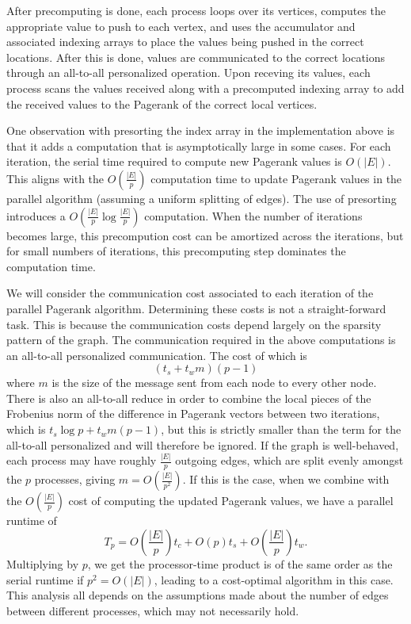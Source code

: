 \documentclass[a4paper]{article}
\begin{document}
After precomputing is done, each process loops over its vertices, computes the appropriate value to push to each vertex, and uses the accumulator and
associated indexing arrays to place the values being pushed in the correct locations. After this is done, values are communicated to the correct
locations through an all-to-all personalized operation. Upon receving its values, each process scans the values received along with a precomputed
indexing array to add the received values to the Pagerank of the correct local vertices.

One observation with presorting the index array in the implementation above is that it adds a computation that is asymptotically large in some cases. For each
iteration, the serial time required to compute new Pagerank values is $O(|E|)$. This aligns with the $O(\frac{|E|}{p})$ computation time to update
Pagerank values in the parallel algorithm (assuming a uniform splitting of edges). The use of presorting introduces a $O(\frac{|E|}{p} \log \frac{|E|}{p} )$ computation. When the number of
iterations becomes large, this precompution cost can be amortized across the iterations, but for small numbers of iterations, this
precomputing step dominates the computation time.

We will consider the communication cost associated to each iteration of the parallel Pagerank algorithm. Determining these costs is not a straight-forward task. This is because the communication
costs depend largely on the sparsity pattern of the graph. The communication required in the above computations is an all-to-all personalized
communication. The cost of which is
\[ (t_s + t_w m) (p - 1) \]
where $m$ is the size of the message sent from each node to every other node. There is also an all-to-all reduce in order to combine the local pieces
of the Frobenius norm of the difference in Pagerank vectors between two iterations, which is $t_s \log p + t_w m (p-1)$, but this is strictly smaller
than the term for the all-to-all personalized and will therefore be ignored. If the graph is well-behaved, each process may have roughly
$\frac{|E|}{p}$ outgoing edges, which are split evenly amongst the $p$ processes, giving $m = O \left( \frac{|E|}{p^2} \right)$. If this is the case,
when we combine with the $O \left( \frac{|E|}{p} \right)$ cost of computing the updated Pagerank values, we have a parallel runtime of
\[ T_p = O \left( \frac{|E|}{p} \right) t_c + O(p) t_s + O \left( \frac{|E|}{p} \right) t_w .\]
Multiplying by $p$, we get the processor-time product is of the same order as the serial runtime if $p^2 = O(|E|)$, leading to a cost-optimal
algorithm in this case. This analysis all depends on the assumptions made about the number of edges between different processes, which may not
necessarily hold.
\end{document}
